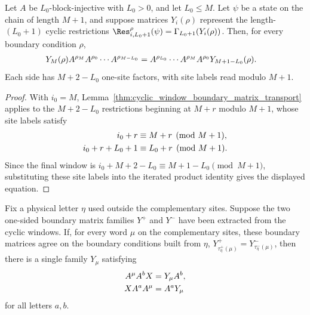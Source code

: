 \begin{lemma}
    \label{lem:closure_property_boundary_condition_long_product_window_witnesses}
    \leanok
    Let $A$ be $L_0$-block-injective with $L_0>0$, and let $L_0\le M$. Let
    $\psi$ be a state on the chain of length $M+1$, and suppose matrices
    $Y_i(\rho)$ represent the length-$(L_0+1)$ cyclic restrictions
    $\Res^\rho_{i,L_0+1}(\psi)=\Gamma_{L_0+1}(Y_i(\rho))$. Then, for every
    boundary condition $\rho$,
    \begin{align}
        Y_M(\rho)A^{\rho_M}A^{\rho_0}\cdots A^{\rho_{M-L_0}}
         & =A^{\rho_{L_0}}\cdots A^{\rho_M}A^{\rho_0}
        Y_{M+1-L_0}(\rho). \notag
    \end{align}
    Each side has $M+2-L_0$ one-site factors, with site labels read modulo
    $M+1$.
\end{lemma}

\begin{proof}
    \leanok
    With $i_0=M$, Lemma~\ref{thm:cyclic_window_boundary_matrix_transport}
    applies to the $M+2-L_0$ restrictions beginning at $M+r$ modulo $M+1$,
    whose site labels satisfy
    \begin{align}
        i_0+r       & \equiv M+r\pmod{M+1}, \notag   \\
        i_0+r+L_0+1 & \equiv L_0+r\pmod{M+1}. \notag
    \end{align}
    Since the final window is
    $i_0+M+2-L_0\equiv M+1-L_0\pmod{M+1}$, substituting these site labels into
    the iterated product identity gives the displayed equation.
\end{proof}

\begin{lemma}%
    \label{lem:two_sided_middle_of_wrapped_witness_comparison}
    \leanok
    Fix a physical letter $\eta$ used outside the complementary sites. Suppose
    the two one-sided boundary matrix families $Y^+$ and $Y^-$ have been
    extracted from the cyclic windows. If, for every word $\mu$ on the
    complementary sites, these boundary matrices agree on the boundary
    conditions built from $\eta$,
    $Y^+_{\tau^+_\eta(\mu)}=Y^-_{\tau^-_\eta(\mu)}$, then there is a single
    family $Y_\mu$ satisfying
    \begin{align}
        A^\mu A^bX & =Y_\mu A^b, \notag \\
        X A^aA^\mu & =A^aY_\mu \notag
    \end{align}
    for all letters $a,b$.
\end{lemma}


